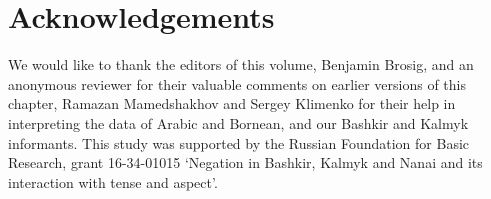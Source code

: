 \documentclass[output=paper]{langsci/langscibook}
\begin{document}
\section*{Acknowledgements}
We would like to thank the editors of this volume, Benjamin Brosig, and an anonymous reviewer for their valuable comments on earlier versions of this chapter, Ramazan Mamedshakhov and Sergey Klimenko for their help in interpreting the data of Arabic and Bornean, and our Bashkir and Kalmyk informants. This study was supported by the Russian Foundation for Basic Research, grant 16-34-01015 ‘Negation in Bashkir, Kalmyk and Nanai and its interaction with tense and aspect’.


{\sloppy\printbibliography[heading=subbibliography,notkeyword=this]}
\end{document}

